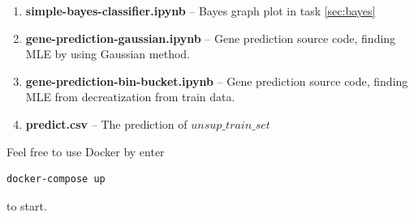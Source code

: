 \documentclass[12pt]{article}
\begin{document}
\begin{enumerate}
  \item \textbf{simple-bayes-classifier.ipynb} -- Bayes graph plot in task \ref{sec:bayes}
  \item \textbf{gene-prediction-gaussian.ipynb} -- Gene prediction source code, finding MLE by using Gaussian method.
  \item \textbf{gene-prediction-bin-bucket.ipynb} -- Gene prediction source code, finding MLE from decreatization from train data.
  \item \textbf{predict.csv} -- The prediction of $unsup\_train\_set$
\end{enumerate}
Feel free to use Docker by enter 
\begin{lstlisting}[language=bash]
  docker-compose up
\end{lstlisting}
to start.
\end{document}
